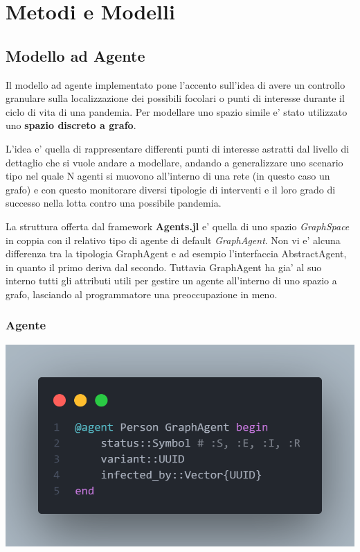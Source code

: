 \section{Metodi e Modelli}

\subsection{Modello ad Agente}

Il modello ad agente implementato pone l'accento sull'idea di avere
un controllo granulare sulla localizzazione dei possibili 
focolari o punti di interesse durante il ciclo di vita di una pandemia.
Per modellare uno spazio simile e' stato utilizzato uno \textbf{spazio discreto 
a grafo}. 

L'idea e' quella di rappresentare differenti punti di interesse astratti dal
livello di dettaglio che si vuole andare a modellare, andando a generalizzare
uno scenario tipo nel quale N agenti si muovono all'interno di una rete 
(in questo caso un grafo) e con questo monitorare diversi tipologie di interventi
e il loro grado di successo nella lotta contro una possibile pandemia.

La struttura offerta dal framework \textbf{Agents.jl} e' quella di uno 
spazio \emph{GraphSpace} in coppia con il relativo tipo di agente di default
\emph{GraphAgent}. Non vi e' alcuna differenza tra la tipologia GraphAgent e 
ad esempio l'interfaccia AbstractAgent, in quanto il primo deriva dal secondo. 
Tuttavia GraphAgent ha gia' al suo interno tutti gli attributi utili per 
gestire un agente all'interno di uno spazio a grafo, lasciando al programmatore una
preoccupazione in meno. 

\subsubsection*{Agente}
\begin{minipage}{\linewidth}
    \centering
    \includegraphics[width=\textwidth]{img/agent_code.png}
    \label{fig:Agent_code}
\end{minipage}

